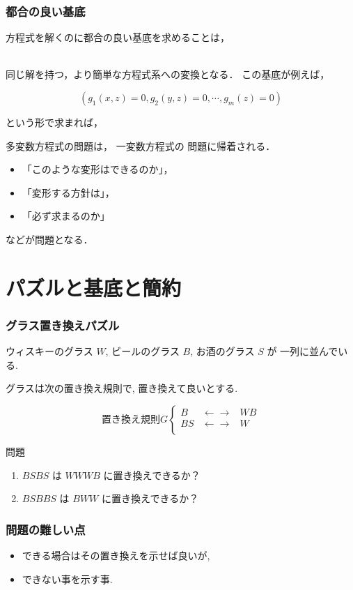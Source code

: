 \documentclass[dvipdfmx,11pt,notheorems]{beamer}
\theoremstyle{definition}
\begin{document}
\begin{frame}\frametitle{都合の良い基底}

方程式を解くのに都合の良い基底を求めることは，

\ \\

同じ解を持つ，より簡単な方程式系への変換となる．
この基底が例えば，

\[
(g_1(x, z) =0, g_2(y,z) = 0, \cdots, g_m(z) =0)
\]

という形で求まれば，

多変数方程式の問題は， 一変数方程式の
問題に帰着される．

\begin{itemize}
\item 「このような変形はできるのか」，
\item 「変形する方針は」，
\item 「必ず求まるのか」
\end{itemize}

などが問題となる．
\end{frame}

\section{パズルと基底と簡約}

\begin{frame}\frametitle{グラス置き換えパズル}

ウィスキーのグラス $W$, ビールのグラス $B$, お酒のグラス $S$ が
一列に並んでいる.

グラスは次の置き換え規則で, 置き換えて良いとする.

\[
\mbox{置き換え規則} G \left\{ 
 \begin{array}{rll}
B &  \leftarrow\rightarrow  &  W B\\
BS& \leftarrow\rightarrow   & W  \\
 \end{array}
\right.
\]

\begin{block}{問題}
\begin{enumerate}
\item $BSBS$ は $WWWB$ に置き換えできるか？
\item $BSBBS$ は $BWW$ に置き換えできるか？
\end{enumerate}
\end{block}
\end{frame}

\begin{frame}\frametitle{問題の難しい点}
\begin{itemize}
\item できる場合はその置き換えを示せば良いが,
\item できない事を示す事.
\end{itemize}
\end{frame}
\end{document}
